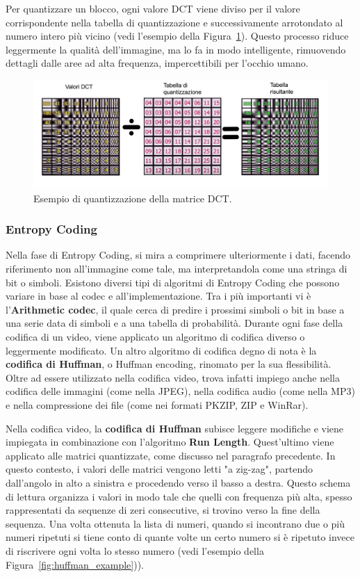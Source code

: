 \documentclass[a4paper,12pt, oneside]{article}
\begin{document}
Per quantizzare un blocco, ogni valore DCT viene diviso per il valore corrispondente nella
tabella di quantizzazione e successivamente arrotondato al numero intero più vicino (vedi
l'esempio della Figura~\ref{fig:quantization_example}). Questo processo riduce leggermente la
qualità dell'immagine, ma lo fa in modo intelligente, rimuovendo dettagli dalle aree ad alta
frequenza, impercettibili per l'occhio umano.

\begin{figure}[h]
    \centering
    \includegraphics[width=1\textwidth]{images/quantization-example.png}
    \caption{Esempio di quantizzazione della matrice DCT.}
    \label{fig:quantization_example}
\end{figure}

\subsubsection{Entropy Coding}
Nella fase di Entropy Coding, si mira a comprimere ulteriormente i dati, facendo riferimento non
all'immagine come tale, ma interpretandola come una stringa di bit o simboli. Esistono diversi tipi di
algoritmi di Entropy Coding che possono variare in base al codec e all'implementazione.
Tra i più importanti vi è l'\textbf{Arithmetic codec}, il quale cerca di predire i prossimi
simboli o bit in base a una serie data di simboli e a una tabella di probabilità. Durante ogni fase
della codifica di un video, viene applicato un algoritmo di codifica diverso o leggermente
modificato. Un altro algoritmo di codifica degno di nota è la \textbf{codifica di Huffman}, o
Huffman encoding, rinomato per la sua flessibilità. Oltre ad essere utilizzato nella codifica video,
trova infatti impiego anche nella codifica delle immagini (come nella JPEG), nella codifica audio
(come nella MP3) e nella compressione dei file (come nei formati PKZIP, ZIP e WinRar).

Nella codifica video, la \textbf{codifica di Huffman} subisce leggere modifiche e viene impiegata
in combinazione con l'algoritmo \textbf{Run Length}. Quest'ultimo viene applicato alle matrici
quantizzate, come discusso nel paragrafo precedente. In questo contesto, i valori delle matrici vengono
letti "a zig-zag", partendo dall'angolo in alto a sinistra e procedendo verso il basso a destra.
Questo schema di lettura organizza i valori in modo tale che quelli con frequenza più alta, spesso 
rappresentati da sequenze di zeri consecutive, si trovino verso la fine della sequenza. Una volta ottenuta
la lista di numeri, quando si incontrano due o più numeri ripetuti si tiene conto di quante volte un certo
numero si è ripetuto invece di riscrivere ogni volta lo stesso numero (vedi l'esempio della
Figura~\ref{fig:huffman_example})).
\end{document}
